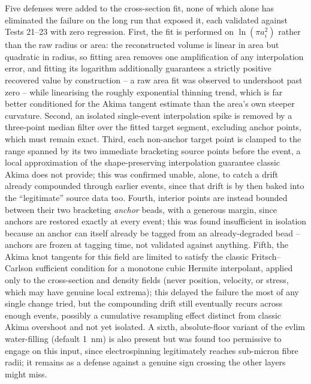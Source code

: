 Five defenses were added to the cross-section fit, none of which alone has
eliminated the failure on the long run that exposed it, each validated
against Tests 21--23 with zero regression. First, the fit is performed on
$\ln\left(\pi a_{i}^{2}\right)$ rather than the raw radius or area: the
reconstructed volume is linear in area but quadratic in radius, so fitting
area removes one amplification of any interpolation error, and fitting its
logarithm additionally guarantees a strictly positive recovered value by
construction -- a raw area fit was observed to undershoot past zero -- while
linearising the roughly exponential thinning trend, which is far better
conditioned for the Akima tangent estimate than the area's own steeper
curvature. Second, an isolated single-event interpolation spike is removed
by a three-point median filter over the fitted target segment, excluding
anchor points, which must remain exact. Third, each non-anchor target point
is clamped to the range spanned by its two immediate bracketing source
points before the event, a local approximation of the shape-preserving
interpolation guarantee classic Akima does not provide; this was confirmed
unable, alone, to catch a drift already compounded through earlier events,
since that drift is by then baked into the ``legitimate'' source data too.
Fourth, interior points are instead bounded between their two bracketing
\emph{anchor} beads, with a generous margin, since anchors are restored
exactly at every event; this was found insufficient in isolation because an
anchor can itself already be tagged from an already-degraded bead -- anchors
are frozen at tagging time, not validated against anything. Fifth, the
Akima knot tangents for this field are limited to satisfy the classic
Fritsch--Carlson sufficient condition for a monotone cubic Hermite
interpolant, applied only to the cross-section and density fields (never
position, velocity, or stress, which may have genuine local extrema); this
delayed the failure the most of any single change tried, but the
compounding drift still eventually recurs across enough events, possibly a
cumulative resampling effect distinct from classic Akima overshoot and not
yet isolated. A sixth, absolute-floor variant of the evlim water-filling
(default 1~nm) is also present but was found too permissive to engage on
this input, since electrospinning legitimately reaches sub-micron fibre
radii; it remains as a defense against a genuine sign crossing the other
layers might miss.

